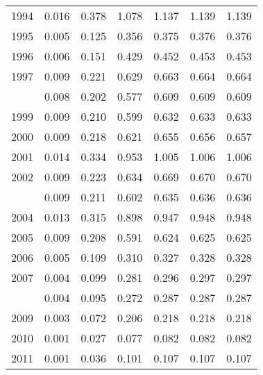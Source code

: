\documentclass[
]{article}
\begin{document}
\begin{longtable}[t]{lrrrrrr}
1994 & 0.016 & 0.378 & 1.078 & 1.137 & 1.139 & 1.139\\
1995 & 0.005 & 0.125 & 0.356 & 0.375 & 0.376 & 0.376\\
1996 & 0.006 & 0.151 & 0.429 & 0.452 & 0.453 & 0.453\\
1997 & 0.009 & 0.221 & 0.629 & 0.663 & 0.664 & 0.664\\
\addlinespace
1998 & 0.008 & 0.202 & 0.577 & 0.609 & 0.609 & 0.609\\
1999 & 0.009 & 0.210 & 0.599 & 0.632 & 0.633 & 0.633\\
2000 & 0.009 & 0.218 & 0.621 & 0.655 & 0.656 & 0.657\\
2001 & 0.014 & 0.334 & 0.953 & 1.005 & 1.006 & 1.006\\
2002 & 0.009 & 0.223 & 0.634 & 0.669 & 0.670 & 0.670\\
\addlinespace
2003 & 0.009 & 0.211 & 0.602 & 0.635 & 0.636 & 0.636\\
2004 & 0.013 & 0.315 & 0.898 & 0.947 & 0.948 & 0.948\\
2005 & 0.009 & 0.208 & 0.591 & 0.624 & 0.625 & 0.625\\
2006 & 0.005 & 0.109 & 0.310 & 0.327 & 0.328 & 0.328\\
2007 & 0.004 & 0.099 & 0.281 & 0.296 & 0.297 & 0.297\\
\addlinespace
2008 & 0.004 & 0.095 & 0.272 & 0.287 & 0.287 & 0.287\\
2009 & 0.003 & 0.072 & 0.206 & 0.218 & 0.218 & 0.218\\
2010 & 0.001 & 0.027 & 0.077 & 0.082 & 0.082 & 0.082\\
2011 & 0.001 & 0.036 & 0.101 & 0.107 & 0.107 & 0.107\\*
\end{longtable}
\end{document}
